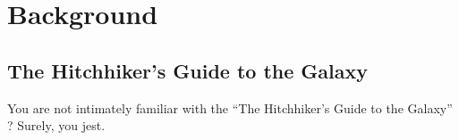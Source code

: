 \chapter{Background}

\section{The Hitchhiker's Guide to the Galaxy}

You are not intimately familiar with the
``The Hitchhiker's Guide to the Galaxy'' \cite{Adams_1980a}?
Surely, you jest.
